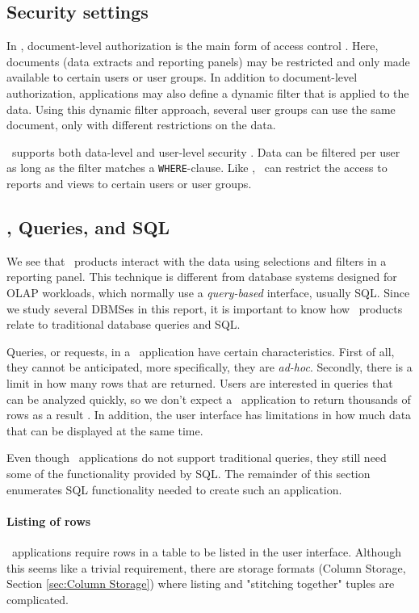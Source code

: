 \subsection{Security settings}
\label{sub:Security settings}
In \qlikview, document-level authorization is the main form of access control \cite{Qlik2011-hj}. Here, documents (data extracts and reporting panels) may be restricted and only made available to certain users or user groups. In addition to document-level authorization, applications may also define a dynamic filter that is applied to the data. Using this dynamic filter approach, several user groups can use the same document, only with different restrictions on the data.

\tableau~supports both data-level and user-level security \cite{Kamkolkar2015-iq}. Data can be filtered per user as long as the filter matches a \texttt{WHERE}-clause. Like \qlikview, \tableau~can restrict the access to reports and views to certain users or user groups.

\subsection{\bd, Queries, and SQL}
\label{sub:Business Discovery, Queries, and SQL}
We see that \bd~products interact with the data using selections and filters in a reporting panel. This technique is different from database systems designed for OLAP workloads, which normally use a \textit{query-based} interface, usually SQL. Since we study several DBMSes in this report, it is important to know how \bd~products relate to traditional database queries and SQL.

Queries, or requests, in a \bd~application have certain characteristics. First of all, they cannot be anticipated, more specifically, they are \textit{ad-hoc}. Secondly, there is a limit in how many rows that are returned. Users are interested in queries that can be analyzed quickly, so we don't expect a \bd~application to return thousands of rows as a result \cite{Ferrari2012-hm}. In addition, the user interface has limitations in how much data that can be displayed at the same time.


Even though \bd~applications do not support traditional queries, they still need some of the functionality provided by SQL. The remainder of this section enumerates SQL functionality needed to create such an application.

\paragraph{Listing of rows}
\bd~applications require rows in a table to be listed in the user interface. Although this seems like a trivial requirement, there are storage formats (Column Storage, Section \ref{sec:Column Storage}) where listing and "stitching together" tuples are complicated. 

